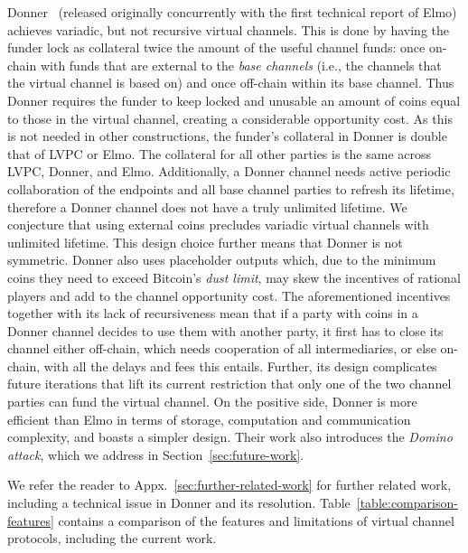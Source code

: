  Donner~\cite{donner}
    (released originally concurrently with the first technical report of Elmo) 
achieves variadic, but not recursive
  virtual channels. This is
  done by having the funder lock as
  collateral twice the amount of the useful channel funds: once on-chain with
  funds that are external to the \emph{base channels} (i.e., the channels that the
  virtual channel is based on) and once off-chain within its base channel. Thus
  Donner requires the funder to keep locked and unusable an amount of coins
  equal to those in the virtual channel, creating a considerable opportunity
  cost. As this is not needed in other
  constructions, the funder's collateral in Donner is double that of LVPC or Elmo. The
  collateral for all other parties is the same
  across LVPC, Donner, and Elmo.
  Additionally, a Donner channel needs active periodic collaboration of the
  endpoints and all base channel parties to refresh
  its lifetime, therefore a Donner channel does not have a truly unlimited
  lifetime. We conjecture that using external coins precludes variadic
  virtual channels with unlimited lifetime. This
  design choice further means that Donner is not symmetric. Donner also uses
  placeholder outputs which, due to the minimum coins they need to
  exceed Bitcoin's \emph{dust limit}, may skew the incentives of rational players
  and add to the channel
  opportunity cost. The aforementioned incentives
  together with its lack of recursiveness mean that if a party with coins in a
  Donner channel decides to use them with another party, it first has to close
  its channel either off-chain, which needs cooperation of all intermediaries, or
  else on-chain, with all the delays and fees this entails.
  Further, its design complicates
  future iterations that lift its current restriction that only one of the two
  channel parties can fund the virtual channel. On the positive side, Donner is
  more efficient than Elmo in terms of storage, computation and communication
  complexity, and boasts a simpler design. 
  Their work also introduces the \emph{Domino attack},
  which we address in Section~\ref{sec:future-work}.

  We refer the reader to Appx.~\ref{sec:further-related-work} for further
  related work, including a technical issue in Donner and its resolution.
  Table~\ref{table:comparison-features} contains a comparison of the
  features and limitations of virtual channel protocols, including the current
  work.
